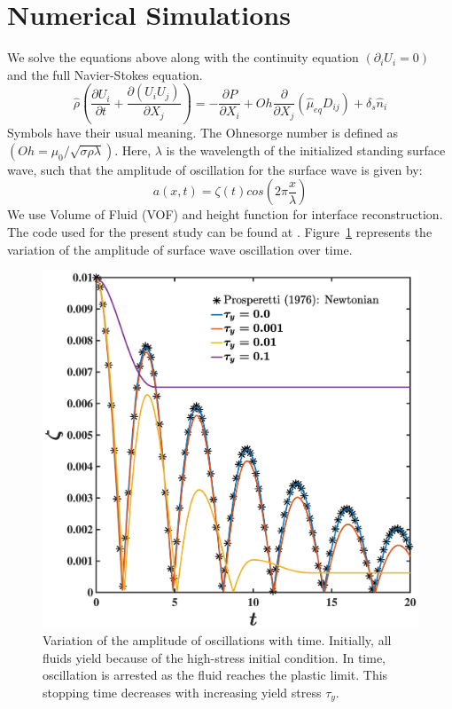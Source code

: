 \documentclass[]{article}
\begin{document}
\section{Numerical Simulations}
We solve the equations above along with the continuity equation $\left(\partial_{i}U_i = 0\right)$ and the full Navier-Stokes equation.
\begin{equation}
\hat{\rho}\left(\frac{\partial U_i}{\partial t} + \frac{\partial\left(U_iU_j\right)}{\partial X_j}\right) = -\frac{\partial P}{\partial X_i} + Oh\frac{\partial}{\partial X_j}\left(\hat{\mu}_{eq}D_{ij}\right) + \delta_s\hat{n}_i
\end{equation}
Symbols have their usual meaning. The Ohnesorge number is defined as $\left(Oh = \mu_0/\sqrt{\sigma\rho\lambda}\right)$. Here, $\lambda$ is the wavelength of the initialized standing surface wave, such that the amplitude of oscillation for the surface wave is given by:
\begin{equation}
a(x,t) = \zeta(t)cos\left(2\pi\frac{x}{\lambda}\right)
\end{equation}
We use Volume of Fluid (VOF) and height function \citep{popinet2009accurate} for interface reconstruction. The code used for the present study can be found at \href{http://basilisk.fr/sandbox/vatsal/GenaralizedNewtonian/SurfaceWavesBingham.c}{\cite{vatsal}}. Figure~\ref{Figure::Results} represents the variation of the amplitude of surface wave oscillation over time.
\begin{figure}
\begin{center}
 \includegraphics[width=\textwidth]{Amplitude}
 \caption{Variation of the amplitude of oscillations with time. Initially, all fluids yield because of the high-stress initial condition. In time, oscillation is arrested as the fluid reaches the plastic limit. This stopping time decreases with increasing yield stress $\tau_y$.}
 \label{Figure::Results}
\end{center}
\end{figure}
\end{document}
